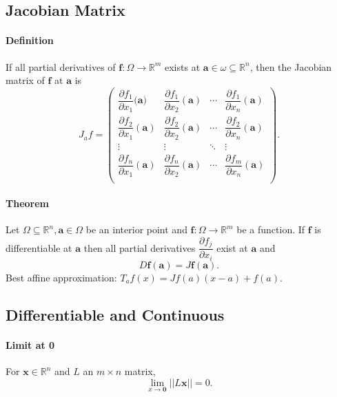 \subsection{Jacobian Matrix}
\paragraph{Definition}
If all partial derivatives of \(\textbf{f}:\Omega \to \mathbb{R}^m\) exists at 
\(\textbf{a}\in \omega \subseteq \mathbb{R}^n\), then the Jacobian matrix of \(\textbf{f}\)
at \(\textbf{a}\) is
\[
    J_a f = 
    \begin{pmatrix}
        \dfrac{\partial f_1}{\partial x_1}(\textbf{a)} & \dfrac{\partial f_1}{\partial x_2}
        (\textbf{a}) & \cdots & \dfrac{\partial f_1}{\partial x_n}(\textbf{a}) \\
        \dfrac{\partial f_2}{\partial x_1}(\textbf{a}) & \dfrac{\partial f_2}{\partial x_2}
        (\textbf{a}) & \cdots & \dfrac{\partial f_2}{\partial x_n}(\textbf{a}) \\
        \vdots & \vdots & \ddots & \vdots \\
        \dfrac{\partial f_n}{\partial x_1}(\textbf{a}) & \dfrac{\partial f_n}{\partial x_2}
        (\textbf{a}) & \cdots & \dfrac{\partial f_m}{\partial x_n}(\textbf{a}) \\
    \end{pmatrix}.
\]

\paragraph{Theorem}
Let \(\Omega \subseteq \mathbb{R}^n, \textbf{a} \in \Omega\) be an interior point and 
\(\textbf{f}:\Omega\to \mathbb{R}^m\) be a function. If \(\textbf{f}\) is differentiable
at \(\textbf{a}\) then all partial derivatives \(\dfrac{\partial f_j}{\partial x_i}\) exist at 
\(\textbf{a}\) and 
\[D\textbf{f}(\textbf{a}) = J\textbf{f}(\textbf{a}).\]
Best affine approximation: \(T_af(x) = Jf(a)(x-a) + f(a)\).

\subsection{Differentiable and Continuous}
\paragraph{Limit at 0} 
For \(\textbf{x} \in \mathbb R^n\) and \(L\) an \(m \times n\) matrix, 
\[\lim_{x\to \textbf{0}} ||L\textbf{x}|| = 0.\]


